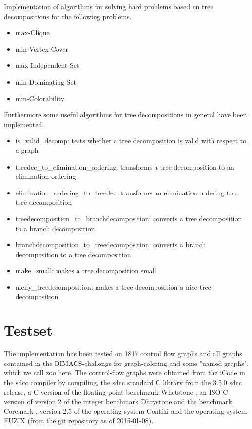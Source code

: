 \documentclass[a4wide]{article}
\begin{document}
Implementation of algorithms for solving hard problems based on tree decompositions for the following problems.

\begin{itemize}
\item max-Clique
\item min-Vertex Cover
\item max-Independent Set
\item min-Dominating Set
\item min-Colorability
\end{itemize}

Furthermore some useful algorithms for tree decompositions in general have been implemented.

\begin{itemize}
\item is\_valid\_decomp: tests whether a tree decomposition is valid with respect to a graph 

\item treedec\_to\_elimination\_ordering: transforms a tree decomposition to an elimination ordering

\item elimination\_ordering\_to\_treedec: transforms an elimination ordering to a tree decomposition

\item treedecomposition\_to\_branchdecomposition: converts a tree decomposition to a branch decomposition 

\item branchdecomposition\_to\_treedecomposition: converts a branch decomposition to a tree decomposition 

\item make\_small: makes a tree decomposition small

\item nicify\_treedecomposition: makes a tree decomposition a nice tree decomposition
\end{itemize}

\section{Testset}

The implementation has been tested on 1817 control flow graphs and all graphs contained in the DIMACS-challenge for graph-coloring \cite{dimacs} and some "named graphs", which we call zoo here. The control-flow graphs were obtained from the iCode in the sdcc compiler \cite{sdcc} by compiling, the sdcc standard C library from the 3.5.0 sdcc release, a C version of the floating-point benchmark Whetstone \cite{whetstone}, an ISO C version of version 2 of the integer benchmark Dhrystone \cite{dhrystone,dhrystone2} and the benchmark Coremark \cite{coremark}, version 2.5 of the operating system Contiki \cite{contiki}and the operating system FUZIX (from the git repository as of 2015-01-08). \\
\end{document}

